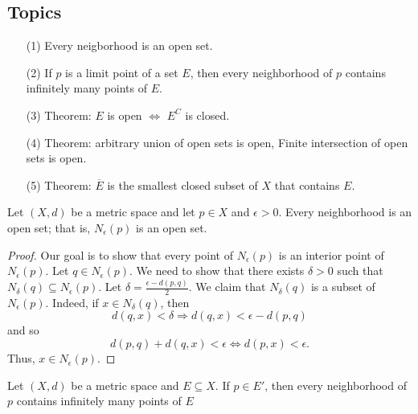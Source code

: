 \documentclass[a4paper]{report}
\begin{document}
\subsection{Topics}

\begin{enumerate}
    \item[(1)] Every neigborhood is an open set.
    \item[(2)] If \( p  \) is a limit point of a set \( E  \), then every neighborhood of \( p  \) contains infinitely many points of \( E  \). 
    \item[(3)] Theorem: \( E  \) is open \( \Longleftrightarrow \) \( E^{C}   \) is closed.
    \item[(4)] Theorem: arbitrary union of open sets is open, Finite intersection of open sets is open.
    \item[(5)] Theorem: \( \overline{E} \) is the smallest closed subset of \( X  \) that contains \( E  \).
\end{enumerate}

\begin{theorem}[ ]
   Let \( (X,d) \) be a metric space and let \( p \in X  \) and \( \epsilon > 0  \). Every neighborhood is an open set; that is, \( {N}_{\epsilon}(p) \) is an open set.
\end{theorem}

\begin{proof}
Our goal is to show that every point of \( {N}_{\epsilon}(p) \) is an interior point of \( {N}_{\epsilon}(p) \). Let \( q \in {N}_{\epsilon}(p) \). We need to show that there exists \( \delta > 0  \) such that \( {N}_{\delta}(q) \subseteq {N}_{\epsilon}(p) \). Let \( \delta = \frac{ \epsilon - d(p,q)  }{ 2 }  \). We claim that \( {N}_{\delta}(q) \) is a subset of \( {N}_{\epsilon}(p) \). Indeed, if \( x \in {N}_{\delta}(q) \), then  
\[  d(q,x) < \delta \Longrightarrow d(q,x) < \epsilon - d(p,q)  \]
and so
\[  d(p,q) + d(q,x) < \epsilon \Longleftrightarrow d(p,x) < \epsilon \tag{triangle inequality}. \]
Thus, \( x \in {N}_{\epsilon}(p) \).

\end{proof}

\begin{theorem}[ ]
    Let \( (X,d) \) be a metric space and \( E \subseteq X  \). If \( p \in E' \), then every neighborhood of \( p  \) contains infinitely many points of \( E  \)
\end{theorem}
\end{document}
